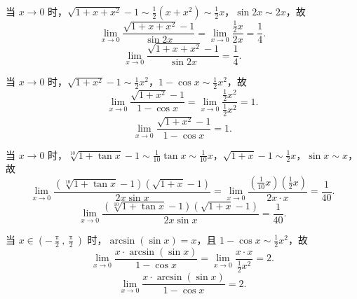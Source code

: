 \begin{solution}

    当 $x \to 0$ 时，$\sqrt{1+x+x^2}-1 \sim \frac{1}{2}(x+x^2) \sim \frac{1}{2}x$，$\sin 2x \sim 2x$，故
    \begin{equation}
        \lim_{x\to 0} \frac{\sqrt{1+x+x^2}-1}{\sin 2x} = \lim_{x\to 0} \frac{\frac{1}{2}x}{2x} = \frac{1}{4}.
    \end{equation}
    \begin{equation}
        \boxed{\lim_{x\to 0} \frac{\sqrt{1+x+x^2}-1}{\sin 2x} = \frac{1}{4}.}
    \end{equation}


    当 $x \to 0$ 时，$\sqrt{1+x^2}-1 \sim \frac{1}{2}x^2$，$1-\cos x \sim \frac{1}{2}x^2$，故
    \begin{equation}
        \lim_{x\to 0} \frac{\sqrt{1+x^2}-1}{1-\cos x} = \lim_{x\to 0} \frac{\frac{1}{2}x^2}{\frac{1}{2}x^2} = 1.
    \end{equation}
    \begin{equation}
        \boxed{\lim_{x\to 0} \frac{\sqrt{1+x^2}-1}{1-\cos x} = 1.}
    \end{equation}


    当 $x \to 0$ 时，$\sqrt[10]{1+\tan x}-1 \sim \frac{1}{10}\tan x \sim \frac{1}{10}x$，$\sqrt{1+x}-1 \sim \frac{1}{2}x$，$\sin x \sim x$，故
    \begin{equation}
        \lim_{x\to 0} \frac{(\sqrt[10]{1+\tan x}-1)(\sqrt{1+x}-1)}{2x\sin x} = \lim_{x\to 0} \frac{\left(\frac{1}{10}x\right)\left(\frac{1}{2}x\right)}{2x \cdot x} = \frac{1}{40}.
    \end{equation}
    \begin{equation}
        \boxed{\lim_{x\to 0} \frac{(\sqrt[10]{1+\tan x}-1)(\sqrt{1+x}-1)}{2x\sin x} = \frac{1}{40}.}
    \end{equation}


    当 $x \in \left(-\frac{\uppi}{2}, \frac{\uppi}{2}\right)$ 时，$\arcsin(\sin x) = x$，且 $1 - \cos x \sim \frac{1}{2}x^2$，故
    \begin{equation}
        \lim_{x\to 0} \frac{x\cdot \arcsin(\sin x)}{1-\cos x} = \lim_{x\to 0} \frac{x \cdot x}{\frac{1}{2}x^2} = 2.
    \end{equation}
    \begin{equation}
        \boxed{\lim_{x\to 0} \frac{x\cdot \arcsin(\sin x)}{1-\cos x} = 2.}
    \end{equation}


\end{solution}
